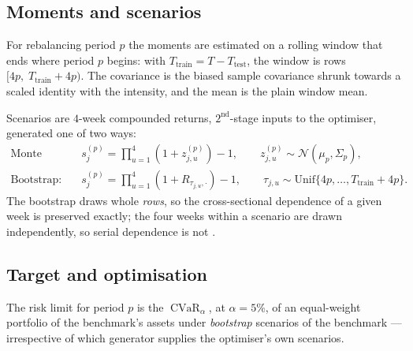 \documentclass[11pt,a4paper]{article}
\DeclareMathOperator{\CVaR}{CVaR}
\begin{document}
\subsection{Moments and scenarios}

For rebalancing period $p$ the moments are estimated on a rolling window that
ends where period $p$ begins: with $T_{\mathrm{train}} = T - T_{\mathrm{test}}$,
the window is rows $[4p,\; T_{\mathrm{train}} + 4p)$. The covariance is the
biased sample covariance shrunk towards a scaled identity with the
\citet{ledoit2004} intensity, and the mean is the plain window mean.

Scenarios are $4$-week compounded returns, $2^{\text{nd}}$-stage inputs to the
optimiser, generated one of two ways:
\begin{align}
  \text{Monte Carlo:} \quad
    & s^{(p)}_{j} = \prod_{u=1}^{4}\left(1 + z^{(p)}_{j,u}\right) - 1,
      \qquad z^{(p)}_{j,u} \sim \mathcal{N}(\mu_p, \Sigma_p),
      \label{eq:mc}\\
  \text{Bootstrap:} \quad
    & s^{(p)}_{j} = \prod_{u=1}^{4}\left(1 + R_{\tau_{j,u}, \cdot}\right) - 1,
      \qquad \tau_{j,u} \sim \mathrm{Unif}\{4p, \ldots, T_{\mathrm{train}} + 4p\}.
      \label{eq:boot}
\end{align}
The bootstrap draws whole \emph{rows}, so the cross-sectional dependence of a
given week is preserved exactly; the four weeks within a scenario are drawn
independently, so serial dependence is not \citep{politis1994}.

\subsection{Target and optimisation}

The risk limit for period $p$ is the $\CVaR_{\alpha}$, at $\alpha = 5\%$, of an
equal-weight portfolio of the benchmark's assets under \emph{bootstrap}
scenarios of the benchmark --- irrespective of which generator supplies the
optimiser's own scenarios.
\end{document}
